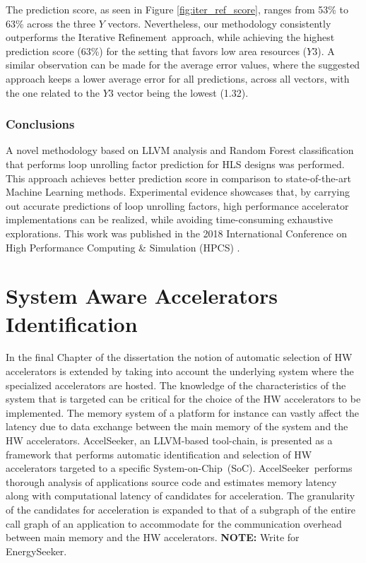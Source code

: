 \documentclass[]{usiinfthesis}
\newcommand{\aseeker}{{AccelSeeker}}
\newcommand{\SoC}{{System-on-Chip}}
\newcommand{\ItRef}{{Iterative Refinement}}
\begin{document}
The prediction score, as seen in Figure \ref{fig:iter_ref_score}, ranges from 53\% to 63\% across the three 
$Y$ vectors. Nevertheless, our methodology consistently outperforms the \ItRef\ approach, while achieving 
the highest prediction score (63\%) for the setting that favors low area resources ($Y3$). A similar
observation can be made for the average error values, where the suggested approach keeps a lower 
average error for all predictions, across all vectors, with the one related to the $Y3$ vector 
being the lowest (1.32).\par

\subsection{Conclusions}

A novel methodology based on LLVM analysis and Random Forest classification that performs loop unrolling 
factor prediction for HLS designs was performed. This approach achieves better prediction score 
in comparison to state-of-the-art Machine Learning methods. Experimental evidence showcases that, 
by carrying out accurate predictions of loop unrolling factors, high performance accelerator 
implementations can be realized, while avoiding time-consuming exhaustive explorations. This work was 
published in the 2018 International Conference on High Performance Computing \& Simulation (HPCS) 
\cite{ZacharopoulosJul18}.


%
%
%
%
%  
%
%
%
%
%


\chapter[System Aware Accelerators Identification]
{System Aware Accelerators Identification}

In the final Chapter of the dissertation the notion of automatic selection of HW accelerators is extended
by taking into account the underlying system where the specialized accelerators are hosted. The knowledge
of the characteristics of the system that is targeted can be critical for the choice of the HW accelerators
to be implemented. The memory system of a platform for instance can vastly affect the latency due to data
exchange between the main memory of the system and the HW accelerators. 
\aseeker, an LLVM-based tool-chain, is presented as a framework that performs automatic identification 
and selection of HW accelerators targeted to a specific \SoC\ (SoC).
\aseeker\ performs thorough analysis of applications source code and estimates memory latency along with 
computational latency of candidates for acceleration. The granularity of the candidates for acceleration 
is expanded to that of a subgraph of the entire call graph of an application to accommodate for the 
communication overhead between main memory and the HW accelerators. 
\textbf{NOTE:} Write for EnergySeeker.
\end{document}
